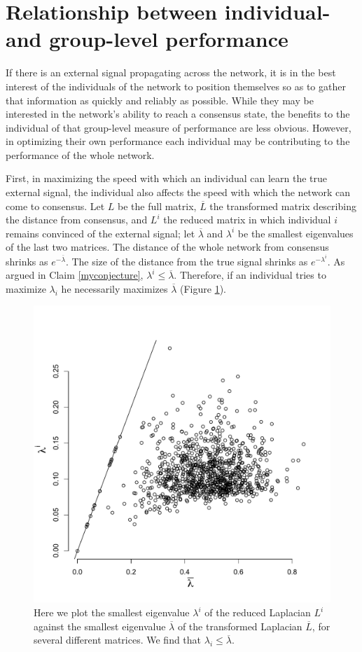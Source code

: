 \documentclass{article}
\begin{document}
\section{Relationship between individual- and group-level performance}
If there is an external signal propagating across the network, it is in the best interest of the individuals of the network to position themselves so as to gather that information as quickly and reliably as possible.  While they may be interested in the network's ability to reach a consensus state, the benefits to the individual of that group-level measure of performance are less obvious.  However, in optimizing their own performance each individual may be contributing to the performance of the whole network.

First, in maximizing the speed with which an individual can learn the true external signal, the individual also affects the speed with which the network can come to consensus.  Let $L$ be the full matrix, $\overline{L}$ the transformed matrix describing the distance from consensus, and $L^i$ the reduced matrix in which individual $i$ remains convinced of the external signal; let $\overline{\lambda}$ and $\lambda^i$ be the smallest eigenvalues of the last two matrices.  The distance of the whole network from consensus shrinks as $e^{-\overline{\lambda}}$.  The size of the distance from the true signal shrinks as $e^{-\lambda^i}$.  As argued in Claim \ref{myconjecture}, $\lambda^i\leq\overline{\lambda}$.  Therefore, if an individual tries to maximize $\lambda_i$ he necessarily maximizes $\overline{\lambda}$ (Figure \ref{eigenvalue_comparison}).
\begin{figure}
\begin{center}
\includegraphics[width=.5\textwidth]{eigenvalue_comparison.pdf}
\end{center}
\caption{\label{eigenvalue_comparison} Here we plot the smallest eigenvalue $\lambda^i$ of the reduced Laplacian $L^i$ against the smallest eigenvalue $\overline{\lambda}$ of the transformed Laplacian $\overline{L}$, for several different matrices.  We find that $\lambda_i\leq \overline{\lambda}$.}
\end{figure}
\end{document}
